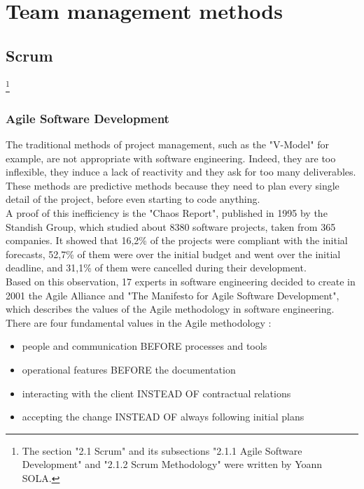\documentclass[a4paper]{report}
\begin{document}
\chapter{Team management methods}
\section{Scrum}

\footnote{The section "2.1 Scrum" and its subsections "2.1.1 Agile Software Development" and "2.1.2 Scrum Methodology" were written by Yoann SOLA.}

\subsection{Agile Software Development}


The traditional methods of project management, such as the "V-Model" for example, are not appropriate with software engineering. Indeed, they are too inflexible, they induce a lack of reactivity and they ask for too many deliverables. These methods are predictive methods because they need to plan every single detail of the project, before even starting to code anything.\\

A proof of this inefficiency is the "Chaos Report", published in 1995 by the Standish Group, which studied about 8380 software projects, taken from 365 companies. It showed that 16,2\% of the projects were compliant with the initial forecasts, 52,7\% of them were over the initial budget and went over the initial deadline, and 31,1\% of them were cancelled during their development.\\

Based on this observation, 17 experts in software engineering decided to create in 2001 the Agile Alliance and "The Manifesto for Agile Software Development", which describes the values of the Agile methodology in software engineering. There are four fundamental values in the Agile methodology :
\begin{itemize}
  \item people and communication BEFORE processes and tools
  \item operational features BEFORE the documentation
  \item interacting with the client INSTEAD OF contractual relations
  \item accepting the change INSTEAD OF always following initial plans\\
\end{itemize}
\end{document}
